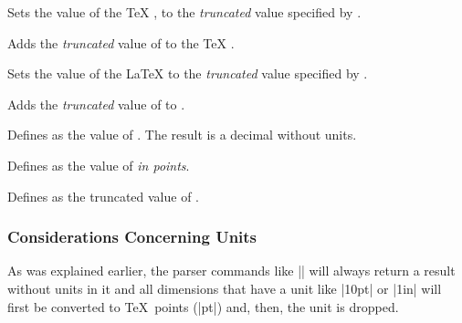 \begin{command}{\pgfmathsetcount{}}
    Sets the value of the \TeX{} , to the \emph{truncated}
    value specified by .
\end{command}

\begin{command}{\pgfmathaddtocount{}}
    Adds the \emph{truncated} value  of  to the \TeX{}
    .
\end{command}

\begin{command}{\pgfmathsetcounter{}}
    Sets the value of the \LaTeX{}  to the \emph{truncated} value
    specified by .
\end{command}

\begin{command}{\pgfmathaddtocounter{}}
    Adds the \emph{truncated} value  of  to .
\end{command}

\begin{command}{\pgfmathsetmacro{}}
    Defines  as the  value of . The result is a
    decimal without units.
\end{command}

\begin{command}{\pgfmathsetlengthmacro{}}
    Defines  as the value of  \emph{in points}.
\end{command}

\begin{command}{\pgfmathtruncatemacro{}}
    Defines  as the truncated value of .
\end{command}


\subsubsection{Considerations Concerning Units}
\label{pgfmath-units}

As was explained earlier, the parser commands like |\pgfmathparse| will always
return a result without units in it and all dimensions that have a unit like
|10pt| or |1in| will first be converted to \TeX\ points (|pt|) and, then, the
unit is dropped.

